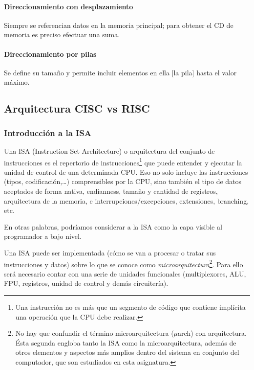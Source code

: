 \documentclass[a4paper, 11pt, titlepage]{article}
\begin{document}
            \paragraph{Direccionamiento con desplazamiento} Siempre se referencian datos en la memoria principal; para obtener 
            el CD de memoria es preciso efectuar una suma.

            \paragraph{Direccionamiento por pilas} Se define su tamaño y permite incluir elementos en ella [la pila] 
            hasta el valor máximo.

    \subsection{Arquitectura CISC vs RISC}

        \subsubsection{Introducción a la ISA}

            Una ISA (Instruction Set Architecture) o arquitectura del conjunto de instrucciones es el repertorio de 
            instrucciones\footnote{
                Una instrucción no es más que un segmento de código que contiene implícita una operación que la CPU debe 
                realizar.
            } que puede entender y ejecutar la unidad de control de una determinada CPU. Eso no solo 
            incluye las instrucciones (tipos, codificación,…) comprensibles por la CPU, sino también el tipo de 
            datos aceptados de forma nativa, endianness, tamaño y cantidad de registros, arquitectura de la memoria, 
            e interrupciones/excepciones, extensiones, branching, etc. 

            En otras palabras, podríamos considerar a la ISA como la capa visible al programador a bajo nivel.

            Una ISA puede ser implementada (cómo se van a procesar o tratar sus instrucciones y datos) sobre lo que se 
            conoce como \textit{microarquitectura}\footnote{
                No hay que confundir el término microarquitectura ($\mu$arch) con arquitectura. Ésta segunda engloba 
                tanto la ISA como la microarquitectura, además de otros elementos y aspectos más amplios dentro del 
                sistema en conjunto del computador, que son estudiados en esta asignatura.
            }. Para ello será necesario contar con una serie de unidades funcionales
            (multiplexores, ALU, FPU, registros, unidad de control y demás circuitería).
\end{document}
